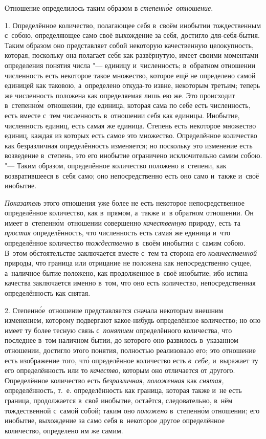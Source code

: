Отношение определилось таким образом в {\em степенн\'{о}е~отношение}.


1. Определённое количество, полагающее себя в~своём инобытии тождественным
с~собою, определяющее само своё выхождение за себя, достигло для-себя-бытия.
Таким образом оно представляет собой некоторую качественную целокупность,
которая, поскольку она полагает себя как развёрнутую, имеет своими моментами
определения понятия числа "--- единицу и~численность; в~обратном отношении
численность есть некоторое такое множество, которое ещё не определено самой
единицей как таковою, а~определено откуда-то извне, некоторым третьим; теперь
же численность положена как определяемая лишь ею же. Это происходит
в~степенн\'{о}м~отношении, где единица, которая сама по себе есть численность,
есть вместе с~тем численность в~отношении себя как единицы. Инобытие,
численность единиц, есть самая же единица. Степень есть некоторое множество
единиц, каждая из которых есть самое это множество. Определённое количество как
безразличная определённость изменяется; но поскольку это изменение есть
возведение в~степень, это его инобытие ограничено исключительно самим собою.
"--- Таким образом, определённое количество положено в~степени, как
возвратившееся в~себя само; оно непосредственно есть оно само и~также
и~своё инобытие.

{\em Показатель} этого отношения уже более не есть некоторое непосредственное
определённое количество, как в~прямом, а~также и~в обратном отношении. Он имеет
в~степенн\'{о}м~отношении совершенно {\em качественную} природу, есть та
{\em простая} определённость, что численность есть сама\'{я} же единица и~что
определённое количество {\em тождественно} в~своём инобытии с~самим собою.
В~этом обстоятельстве заключается вместе с~тем та сторона его
{\em количественной} природы, что граница или отрицание не положена как
непосредственно сущее, а~наличное бытие положено, как продолженное в~своё
инобытие; ибо истина качества заключается именно в~том, что оно есть
количество, непосредственная определённость как снятая.

2. Степенн\'{о}е~отношение представляется сначала некоторым внешним изменением,
которому подвергают какое-нибудь определённое количество; но оно имеет ту более
тесную связь с~{\em понятием} определённого количества, что последнее в~том
наличном бытии, до которого оно развилось в~указанном отношении, достигло этого
понятия, полностью реализовало его; это отношение есть изображение того,
чт\'{о} определённое количество есть {\em в~себе,} и~выражает ту его
определённость или то {\em качество,} которым оно отличается от другого.
Определённое количество есть {\em безразличная, положенная} как {\em снятая,}
определённость, т.~е. определённость как граница, которая также и~не есть
граница, продолжается в~своё инобытие, остаётся, следовательно, в~нём
тождественной с~самой собой; таким оно {\em положено} в~степенн\'{о}м
отношении; его инобытие, выхождение за само себя в~некоторое другое
определённое количество, определено им же самим.

